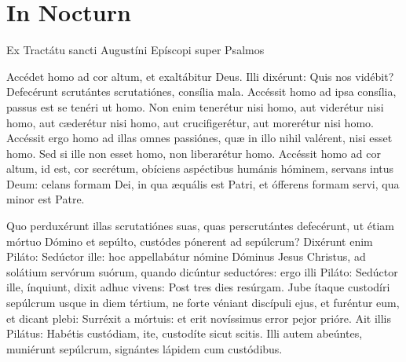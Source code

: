 \section*{In  Nocturn}









    \lesson

    Ex Tractátu sancti Augustíni Epíscopi super Psalmos

    Accédet homo ad cor altum, et exaltábitur Deus. Illi dixérunt: Quis nos
    vidébit? Defecérunt scrutántes scrutatiónes, consília mala. Accéssit homo
    ad ipsa consília, passus est se tenéri ut homo. Non enim tenerétur nisi
    homo, aut viderétur nisi homo, aut cæderétur nisi homo, aut crucifigerétur,
    aut morerétur nisi homo. Accéssit ergo homo ad illas omnes passiónes, quæ
    in illo nihil valérent, nisi esset homo. Sed si ille non esset homo, non
    liberarétur homo. Accéssit homo ad cor altum, id est, cor secrétum,
    obíciens aspéctibus humánis hóminem, servans intus Deum: celans formam Dei,
    in qua æquális est Patri, et ófferens formam servi, qua minor est Patre.


 \lesson

 Quo perduxérunt illas scrutatiónes suas, quas perscrutántes defecérunt, ut
 étiam mórtuo Dómino et sepúlto, custódes pónerent ad sepúlcrum? Dixérunt enim
 Piláto: Sedúctor ille: hoc appellabátur nómine Dóminus Jesus Christus, ad
 solátium servórum suórum, quando dicúntur seductóres: ergo illi Piláto:
 Sedúctor ille, ínquiunt, dixit adhuc vivens: Post tres dies resúrgam. Jube
 ítaque custodíri sepúlcrum usque in diem tértium, ne forte véniant discípuli
 ejus, et furéntur eum, et dicant plebi: Surréxit a mórtuis: et erit novíssimus
 error pejor prióre. Ait illis Pilátus: Habétis custódiam, ite, custodíte sicut
 scitis. Illi autem abeúntes, muniérunt sepúlcrum, signántes lápidem cum
 custódibus.

